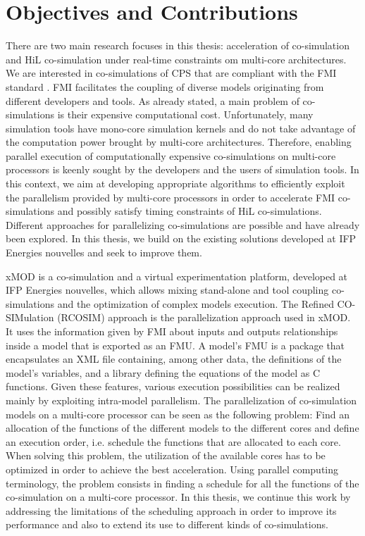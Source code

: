 \section{Objectives and Contributions}

There are two main research focuses in this thesis: acceleration of co-simulation and HiL co-simulation under real-time constraints om multi-core architectures. We are interested in co-simulations of CPS that are compliant with the FMI standard \cite{fmi:2014}. FMI facilitates the coupling of diverse models originating from different developers and tools. As already stated, a main problem of co-simulations is their expensive computational cost. Unfortunately, many simulation tools have mono-core simulation kernels and do not take advantage of the computation power brought by multi-core architectures. Therefore, enabling parallel execution of computationally expensive co-simulations on multi-core processors is keenly sought by the developers and the users of simulation tools. In this context, we aim at developing appropriate algorithms to efficiently exploit the parallelism provided by multi-core processors in order to accelerate FMI co-simulations and possibly satisfy timing constraints of HiL co-simulations. Different approaches for parallelizing co-simulations are possible and have already been explored. In this thesis, we build on the existing solutions developed at IFP Energies nouvelles and seek to improve them. 

xMOD is a co-simulation and a virtual experimentation platform, developed at IFP Energies nouvelles, which allows mixing stand-alone and tool coupling co-simulations and the optimization of complex models execution. The Refined CO-SIMulation (RCOSIM) approach \cite{benkhaled:2014} is the parallelization approach used in xMOD. It uses the information given by FMI about inputs and outputs relationships inside a model that is exported as an FMU. A model's FMU is a package that encapsulates an XML file containing, among other data, the definitions of the model's variables, and a library defining the equations of the model as C functions. Given these features, various execution possibilities can be realized mainly by exploiting intra-model parallelism. The parallelization of co-simulation models on a multi-core processor can be seen as the following problem: Find an allocation of the functions of the different models to the different cores and define an execution order, i.e. schedule the functions that are allocated to each core. When solving this problem, the utilization of the available cores has to be optimized in order to achieve the best acceleration. Using parallel computing terminology, the problem consists in finding a schedule for all the functions of the co-simulation on a multi-core processor. In this thesis, we continue this work by addressing the limitations of the scheduling approach in order to improve its performance and also to extend its use to different kinds of co-simulations.


